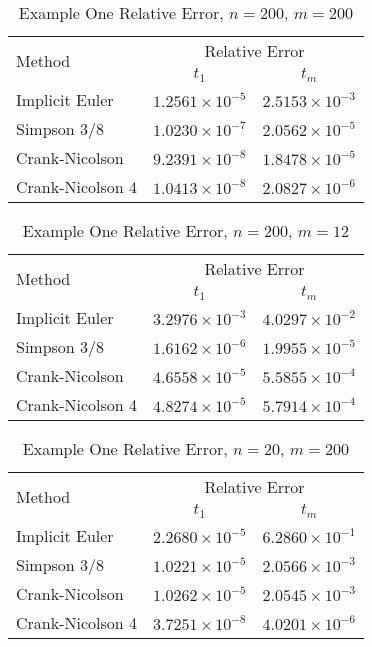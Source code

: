 \documentclass[00main.tex]{subfiles}
\begin{document}
\begin{table}
  \centering
    \begin{tabular}{lcc}
    \multirow{2}{*}{Method} & \multicolumn{2}{c}{Relative Error} \\
     & $t_1$ & $t_m$ \\ \hline
       Implicit Euler  & $1.2561 \times 10^{-5}$ & $2.5153 \times 10^{-3}$ \\
       Simpson 3/8  & $1.0230 \times 10^{-7}$ & $2.0562 \times 10^{-5}$ \\
       Crank-Nicolson  & $9.2391 \times 10^{-8}$ & $1.8478 \times 10^{-5}$ \\
       Crank-Nicolson 4  & $1.0413 \times 10^{-8}$ & $2.0827\times 10^{-6}$ \\
    \end{tabular}%
    \caption{Example One Relative Error, $n=200$, $m=200$}
  \label{example1_relerr}%
\end{table}%

\begin{table}
  \centering
    \begin{tabular}{lcc}
    \multirow{2}{*}{Method} & \multicolumn{2}{c}{Relative Error} \\
     & $t_1$ & $t_m$ \\ \hline
       Implicit Euler  &  $3.2976 \times 10^{-3}$ & $4.0297 \times 10^{-2}$ \\
       Simpson 3/8  & $1.6162 \times 10^{-6}$ & $1.9955 \times 10^{-5}$ \\
       Crank-Nicolson  & $4.6558 \times 10^{-5}$ & $5.5855 \times 10^{-4}$ \\
       Crank-Nicolson 4  & $4.8274 \times 10^{-5}$ & $5.7914 \times 10^{-4}$ \\
    \end{tabular}%
    \caption{Example One Relative Error, $n=200$, $m=12$}
  \label{example1_relerr2}%
\end{table}%


\begin{table}
  \centering
    \begin{tabular}{lcc}
    \multirow{2}{*}{Method} & \multicolumn{2}{c}{Relative Error} \\
     & $t_1$ & $t_m$ \\ \hline
       Implicit Euler  &  $2.2680 \times 10^{-5}$ & $6.2860 \times 10^{-1}$ \\
       Simpson 3/8  & $1.0221 \times 10^{-5}$ & $2.0566 \times 10^{-3}$ \\
       Crank-Nicolson  & $ 1.0262 \times 10^{-5}$ & $2.0545 \times 10^{-3}$ \\
       Crank-Nicolson 4  & $3.7251 \times 10^{-8}$ & $ 4.0201 \times 10^{-6}$ \\
    \end{tabular}%
    \caption{Example One Relative Error, $n=20$, $m=200$}
  \label{example1_relerr3}%
\end{table}%
\end{document}
